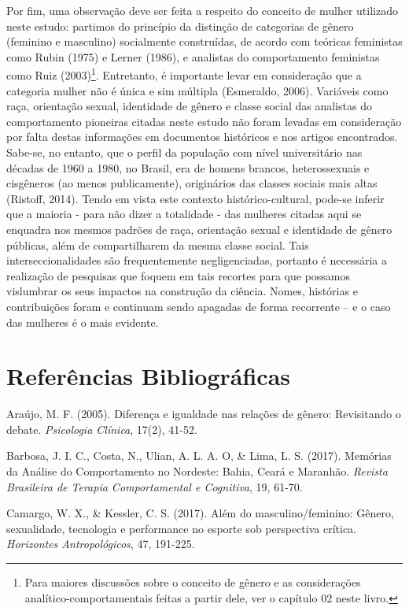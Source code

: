 Por fim, uma observação deve ser feita a respeito do conceito de mulher utilizado neste estudo: partimos do princípio da distinção de categorias de gênero (feminino e masculino) socialmente construídas, de acordo com teóricas feministas como Rubin (1975) e Lerner (1986), e analistas do comportamento feministas como Ruiz (2003)\footnote{Para maiores discussões sobre o conceito de gênero e as considerações analítico-comportamentais feitas a partir dele, ver o capítulo 02 neste livro.}. Entretanto, é importante levar em consideração que a categoria mulher não é única e sim múltipla (Esmeraldo, 2006). Variáveis como raça, orientação sexual, identidade de gênero e classe social das analistas do comportamento pioneiras citadas neste estudo não foram levadas em consideração por falta destas informações em documentos históricos e nos artigos encontrados. Sabe-se, no entanto, que o perfil da população com nível universitário nas décadas de 1960 a 1980, no Brasil, era de homens brancos, heterossexuais e cisgêneros (ao menos publicamente), originários das classes sociais mais altas (Ristoff, 2014). Tendo em vista este contexto histórico-cultural, pode-se inferir que a maioria - para não dizer a totalidade - das mulheres citadas aqui se enquadra nos mesmos padrões de raça, orientação sexual e identidade de gênero públicas, além de compartilharem da mesma classe social. Tais interseccionalidades são frequentemente negligenciadas, portanto é necessária a realização de pesquisas que foquem em tais recortes para que possamos vislumbrar os seus impactos na construção da ciência. Nomes, histórias e contribuições foram e continuam sendo apagadas de forma recorrente – e o caso das mulheres é o mais evidente.

\chapter*{Referências Bibliográficas}
\hangindent=25pt
\noindent Araújo, M. F. (2005). Diferença e igualdade nas relações de gênero: Revisitando o debate. \textit{Psicologia Clínica}, 17(2), 41-52.

\hangindent=25pt
\noindent Barbosa, J. I. C., Costa, N., Ulian, A. L. A. O, \& Lima, L. S. (2017). Memórias da Análise do Comportamento no Nordeste: Bahia, Ceará e Maranhão. \textit{Revista Brasileira de Terapia Comportamental e Cognitiva}, 19, 61-70.

\hangindent=25pt
\noindent Camargo, W. X., \& Kessler, C. S. (2017). Além do masculino/feminino: Gênero, sexualidade, tecnologia e performance no esporte sob perspectiva crítica. \textit{Horizontes Antropológicos}, 47, 191-225.

